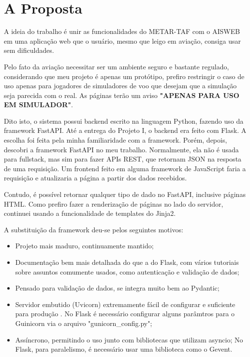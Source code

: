 \chapter{A Proposta}
A ideia do trabalho é unir as funcionalidades do METAR-TAF com o AISWEB em uma 
aplicação web que o usuário, mesmo que leigo em aviação, consiga usar sem 
dificuldades.

Pelo fato da aviação necessitar ser um ambiente seguro e bastante regulado, considerando
que meu projeto é apenas um protótipo, prefiro restringir o caso de uso apenas
para jogadores de simuladores de voo que desejam que a simulação seja parecida
com o real. As páginas terão um aviso \textbf{"APENAS PARA USO EM SIMULADOR"}.

Dito isto, o sistema possui backend escrito na linguagem Python, fazendo uso da 
framework FastAPI. Até a entrega do Projeto I, o backend era feito com Flask. 
A escolha foi feita pela minha familiaridade com a framework. Porém, depois, 
descobri a framework FastAPI no meu trabalho. Normalmente, ela não é usada para 
fullstack, mas sim para fazer APIs REST, que retornam JSON na resposta de uma 
requisição. Um frontend feito em alguma framework de JavaScript faria a requisição
 e atualizaria a página a partir dos dados recebidos.

Contudo, é possível retornar qualquer tipo de dado no FastAPI, inclusive páginas 
HTML. Como prefiro fazer a renderização de páginas no lado do servidor, continuei
usando a funcionalidade de templates do Jinja2.

A substituição da framework deu-se pelos seguintes motivos:

\begin{itemize}
\item Projeto mais maduro, continuamente mantido;
\item Documentação bem mais detalhada do que a do Flask, com vários tutoriais sobre assuntos comumente usados, como autenticação e validação de dados;
\item Pensado para validação de dados, se integra muito bem ao Pydantic;
\item Servidor embutido (Uvicorn) extremamente fácil de configurar e suficiente para produção \cite{fast-api-prod}.
No Flask é necessário configurar alguns parâmtros para o Guinicorn via o arquivo "gunicorn\_config.py";
\item Assíncrono, permitindo o uso junto com bibliotecas que utilizam asyncio;
No Flask, para paralelismo, é necessário usar uma biblioteca como o Gevent.
\end{itemize}

